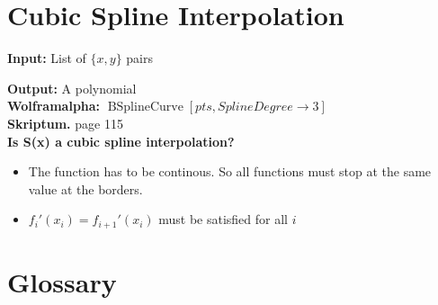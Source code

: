 \documentclass[a4paper,twocolumn]{article}
\newcommand{\io}[2]{{\par\noindent\textbf{Input:} #1 \\}{\textbf{Output:} #2 \\}}
\newcommand{\wa}[1]{\textbf{Wolframalpha:} $#1$ \\}
\newcommand{\scriptref}[1]{\textbf{Skriptum.} page #1 \\}
\begin{document}
\section{Cubic Spline Interpolation}

\io{List of $\{x,y\}$ pairs}{A polynomial}
\wa{\operatorname{BSplineCurve}[pts, SplineDegree\rightarrow3]}
\scriptref{115}

\textbf{Is S(x) a cubic spline interpolation?} \\
\begin{itemize}
  \item The function has to be continous. So all functions must stop
        at the same value at the borders.
  \item $f_i'(x_i) = f_{i+1}'(x_i)$ must be satisfied for all $i$
\end{itemize}

\section{Glossary}
\end{document}
